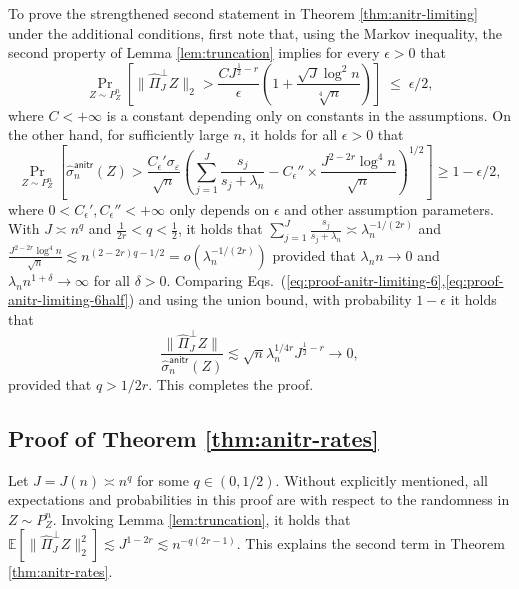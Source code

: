 \documentclass[11pt,a4paper]{article}
\renewcommand{\hat}{\widehat}
\theoremstyle{definition}
\theoremstyle{plain}
\theoremstyle{remark}
\newcommand{\anitr}{\mathsf{anitr}}
\begin{document}
To prove the strengthened second statement in Theorem \ref{thm:anitr-limiting} under the additional conditions, first note that, using the Markov inequality, the second property of Lemma \ref{lem:truncation} implies
for every $\epsilon>0$ that 
\begin{equation}
\Pr_{Z\sim P_Z^n}\left[\|\hat\Pi_J^\perp Z\|_2 > \frac{CJ^{\frac{1}{2}-r}}{\epsilon}\left(1+\frac{\sqrt{J}\log^2 n}{\sqrt[4]{n}}\right)\right] \;\leq\; \epsilon/2,
\label{eq:proof-anitr-limiting-6}
\end{equation}
where $C<+\infty$ is a constant depending only on constants in the assumptions.
{\color{orange}
On the other hand, for sufficiently large $n$, it holds for all $\epsilon>0$ that
\begin{equation}
\Pr_{Z\sim P_Z^n}\left[\hat\sigma_n^\anitr(Z) > \frac{C_\epsilon'\sigma_\varepsilon}{\sqrt{n}}\left(\sum_{j=1}^J \frac{s_j}{s_j+\lambda_n} - C_\epsilon''\times \frac{J^{2-2r}\log^4 n}{\sqrt{n}}\right)^{1/2}\right]\geq 1-\epsilon/2,
\label{eq:proof-anitr-limiting-6half}
\end{equation}
where $0<C_\epsilon',C_\epsilon''<+\infty$ only depends on $\epsilon$ and other assumption parameters.
With $J\asymp n^q$ and $\frac{1}{2r}<q<\frac{1}{2}$, it holds that $\sum_{j=1}^J \frac{s_j}{s_j+\lambda_n}\asymp \lambda_n^{-1/(2r)}$ and $\frac{J^{2-2r}\log^4n}{\sqrt{n}} \lesssim n^{(2-2r)q-1/2} = o(\lambda_n^{-1/(2r)})$
provided that $\lambda_n n \to 0$ and $\lambda_n n^{1+\delta}\to\infty$ for all $\delta>0$. 
Comparing Eqs.~(\ref{eq:proof-anitr-limiting-6},\ref{eq:proof-anitr-limiting-6half}) and using the union bound, with probability $1-\epsilon$ it holds that
$$
\frac{\|\hat\Pi_J^\perp Z\|}{\hat\sigma_n^\anitr(Z)} \lesssim \sqrt{n}\lambda_n^{1/4r} J^{\frac{1}{2}-r} \to 0, 
$$
}
provided that $q>1/2r$. This completes the proof.


\subsection{Proof of Theorem \ref{thm:anitr-rates}}
Let $J=J(n)\asymp n^q$ for some $q\in(0,1/2)$.
Without explicitly mentioned, all expectations and probabilities in this proof are with respect to the randomness in $Z\sim P_Z^n$.
Invoking Lemma \ref{lem:truncation}, it holds that $\mathbb E[\|\hat\Pi_J^\perp Z\|_2^2]\lesssim J^{1-2r} \lesssim n^{-q(2r-1)}$. This explains the second term in Theorem \ref{thm:anitr-rates}.
\end{document}
